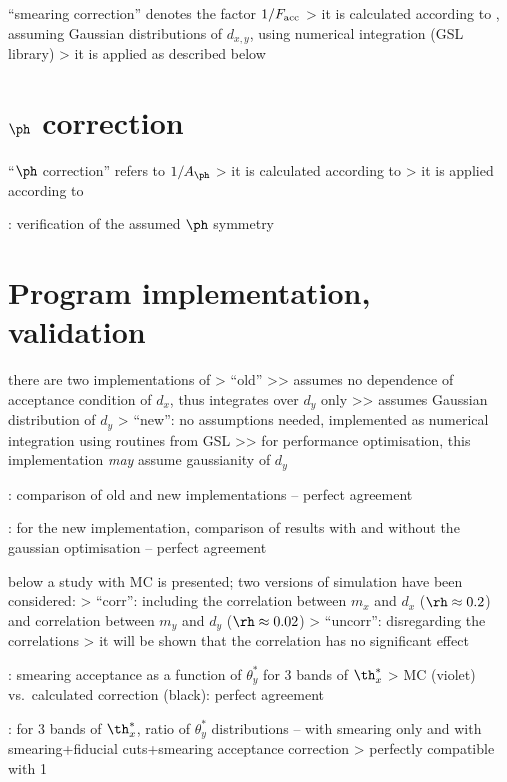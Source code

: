 \> ``smearing correction'' denotes the factor $1/F_{\rm acc}$
\>> it is calculated according to , assuming Gaussian distributions of $d_{x,y}$, using numerical integration (GSL library)
\>> it is applied as described below 


\section{$\ph$ correction}

\> ``$\ph$ correction'' refers to $1 / A_{\ph}$
\>> it is calculated according to 
\>> it is applied according to 


\>  : verification of the assumed $\ph$ symmetry


\section{Program implementation, validation}

\> there are two implementations of 
\>> ``old''
\>>> assumes no dependence of acceptance condition of $d_x$, thus integrates over $d_y$ only
\>>> assumes Gaussian distribution of $d_y$
\>> ``new'': no assumptions needed, implemented as numerical integration using routines from GSL
\>>> for performance optimisation, this implementation {\it may} assume gaussianity of $d_y$

\>  : comparison of old and new implementations -- perfect agreement

\>  : for the new implementation, comparison of results with and without the gaussian optimisation -- perfect agreement

\> below a study with MC is presented; two versions of simulation have been considered:
\>> ``corr'': including the correlation between $m_x$ and $d_x$ ($\rh \approx 0.2$) and correlation between $m_y$ and $d_y$ ($\rh\approx 0.02$)
\>> ``uncorr'': disregarding the correlations
\>> it will be shown that the correlation has no significant effect

\>  : smearing acceptance as a function of $\theta^*_y$ for 3 bands of $\th^*_x$
\>> MC (violet) vs.~calculated correction (black): perfect agreement

\>  : for 3 bands of $\th^*_x$, ratio of $\theta^*_y$ distributions -- with smearing only and with smearing+fiducial cuts+smearing acceptance correction
\>> perfectly compatible with 1

